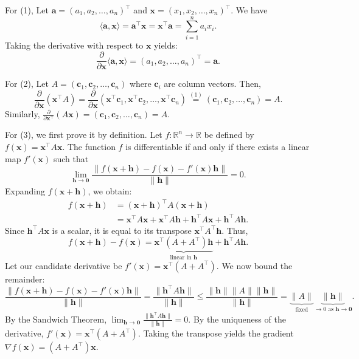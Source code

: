 \documentclass[12pt]{article}
\begin{document}
\begin{pfbox}
For (1),
Let $\mathbf{a} = (a_1, a_2, \dots, a_n)^\top$ and $\mathbf{x} = (x_1, x_2, \dots, x_n)^\top$. We have
$$ \langle \mathbf{a}, \mathbf{x} \rangle = \mathbf{a}^\top \mathbf{x} = \mathbf{x}^\top \mathbf{a} = \sum_{i=1}^n a_i x_i. $$
Taking the derivative with respect to $\mathbf{x}$ yields:
$$ \frac{\partial}{\partial \mathbf{x}} \langle \mathbf{a}, \mathbf{x} \rangle = (a_1, a_2, \dots, a_n)^\top = \mathbf{a}. $$

For (2),
Let $A = (\mathbf{c}_1, \mathbf{c}_2, \dots, \mathbf{c}_n)$ where $\mathbf{c}_i$ are column vectors. Then,
$$ \frac{\partial}{\partial \mathbf{x}} (\mathbf{x}^\top A) = \frac{\partial}{\partial \mathbf{x}} (\mathbf{x}^\top \mathbf{c}_1, \mathbf{x}^\top \mathbf{c}_2, \dots, \mathbf{x}^\top \mathbf{c}_n) \stackrel{(1)}{=} (\mathbf{c}_1, \mathbf{c}_2, \dots, \mathbf{c}_n) = A. $$
Similarly, $\frac{\partial}{\partial \mathbf{x}^\top} (A\mathbf{x}) = (\mathbf{c}_1, \mathbf{c}_2, \dots, \mathbf{c}_n) = A$.

For (3), we first prove it by definition.
Let $f: \mathbb{R}^n \to \mathbb{R}$ be defined by $f(\mathbf{x}) = \mathbf{x}^\top A \mathbf{x}$. 
The function $f$ is differentiable if and only if there exists a linear map $f'(\mathbf{x})$ such that
$$ \lim_{\mathbf{h} \to \mathbf{0}} \frac{\|f(\mathbf{x} + \mathbf{h}) - f(\mathbf{x}) - f'(\mathbf{x})\mathbf{h}\|}{\|\mathbf{h}\|} = 0. $$
Expanding $f(\mathbf{x} + \mathbf{h})$, we obtain:
\begin{align*}
    f(\mathbf{x} + \mathbf{h}) &= (\mathbf{x} + \mathbf{h})^\top A (\mathbf{x} + \mathbf{h}) \\
    &= \mathbf{x}^\top A \mathbf{x} + \mathbf{x}^\top A \mathbf{h} + \mathbf{h}^\top A \mathbf{x} + \mathbf{h}^\top A \mathbf{h}.
\end{align*}
Since $\mathbf{h}^\top A \mathbf{x}$ is a scalar, it is equal to its transpose $\mathbf{x}^\top A^\top \mathbf{h}$. Thus,
$$ f(\mathbf{x} + \mathbf{h}) - f(\mathbf{x}) = \underbrace{\mathbf{x}^\top(A + A^\top)\mathbf{h}}_{\text{linear in } \mathbf{h}} + \mathbf{h}^\top A \mathbf{h}. $$
Let our candidate derivative be $f'(\mathbf{x}) = \mathbf{x}^\top(A + A^\top)$. We now bound the remainder:
$$ \frac{\|f(\mathbf{x} + \mathbf{h}) - f(\mathbf{x}) - f'(\mathbf{x})\mathbf{h}\|}{\|\mathbf{h}\|} = \frac{\|\mathbf{h}^\top A \mathbf{h}\|}{\|\mathbf{h}\|} \le \frac{\|\mathbf{h}\| \|A\| \|\mathbf{h}\|}{\|\mathbf{h}\|} = \underbrace{\|A\|}_{\text{fixed}} \underbrace{\|\mathbf{h}\|}_{\to 0 \text{ as } \mathbf{h} \to \mathbf{0}}. $$
By the Sandwich Theorem, $\lim_{\mathbf{h} \to \mathbf{0}} \frac{\|\mathbf{h}^\top A \mathbf{h}\|}{\|\mathbf{h}\|} = 0$. 
By the uniqueness of the derivative, $f'(\mathbf{x}) = \mathbf{x}^\top(A + A^\top)$. Taking the transpose yields the gradient $\nabla f(\mathbf{x}) = (A + A^\top)\mathbf{x}$.\\


\end{pfbox}
\end{document}
